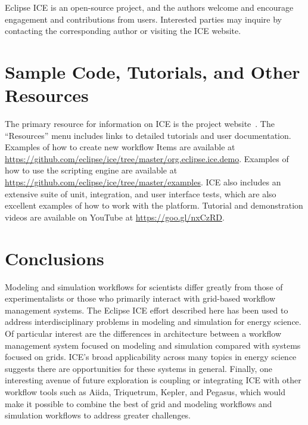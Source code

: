 Eclipse ICE is an open-source project, and the authors welcome and encourage
engagement and contributions from users. Interested parties may inquire by
contacting the corresponding author or visiting the ICE website.

\section{Sample Code, Tutorials, and Other
Resources}\label{sample-code-tutorials-and-other-resources}

The primary resource for information on ICE is the project 
website~\cite{billings_eclipse_2016}. The ``Resources'' menu includes links to
detailed tutorials and user documentation. Examples of how to create
new workflow Items are available at
\url{https://github.com/eclipse/ice/tree/master/org.eclipse.ice.demo}.
Examples of how to use the scripting engine are available at
\url{https://github.com/eclipse/ice/tree/master/examples}. ICE also includes an
extensive suite of unit, integration, and user interface tests, which are
also excellent examples of how to work with the platform. Tutorial and
demonstration videos are available on YouTube at \url{https://goo.gl/nxCzRD}.

\section{Conclusions}\label{conclusions}

Modeling and simulation workflows for scientists differ
greatly from those of experimentalists or those who primarily interact with
grid-based workflow management systems. The Eclipse ICE effort described here 
has been used to address interdisciplinary problems in 
modeling and simulation for energy science. Of particular interest are the
differences in architecture between a workflow management system focused
on modeling and simulation compared with systems focused on grids. ICE's broad
applicability across many topics in energy science suggests
there are opportunities for these systems in general. Finally, one 
interesting avenue of future exploration is coupling or integrating ICE 
with other workflow tools such as Aiida, Triquetrum, Kepler, and Pegasus,
which would make it possible to combine the best of grid and modeling workflows and
simulation workflows to address greater challenges.